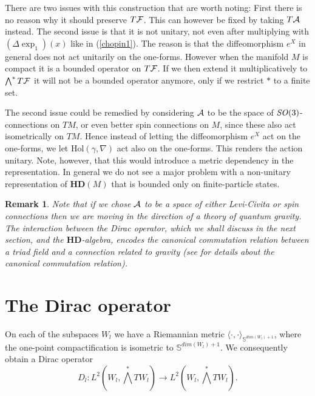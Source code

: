 \documentclass[letterpaper,12pt]{article}
\def\ca{{\cal A}}
\def\cf{{\cal F}}
\newtheorem{remark}{Remark}
\begin{document}
 There are two issues with this construction that are worth noting: First there is no reason why it should preserve $T\cf$. This can however be fixed by taking $T\ca$ instead.
  The second issue is that it is not unitary, not even after multiplying with $(\Delta \exp_1) (x)$ like in (\ref{chopin1}). The reason is that the diffeomorphism $e^X$ in general does not act unitarily on the one-forms. However when the manifold $M$ is compact it is a bounded operator on $T\cf$. If we then extend it multiplicatively to  $\bigwedge^* T\cf $ it will not be a bounded operator anymore, only if we restrict $*$ to a finite set.
  
  The second issue could be remedied by considering $\ca$ to be the space of $\SO3$-connections on $TM$, or even better spin connections on $M$, since these also act isometrically on $TM$. Hence instead of letting the diffeomorphism $e^X$ act on the one-forms, we let $\mbox{Hol}(\gamma,\nabla)$ act also on the one-forms. This renders the action unitary. Note, however, that this would introduce a metric dependency in the representation. 
 In general we do not see a major problem with a non-unitary representation of $\mathbf{HD}(M)$ that is bounded only on finite-particle states.
  
  
  
  \begin{remark}
  Note that if we chose $\ca$ to be a space of either Levi-Civita or spin connections then we are moving in the direction of a theory of quantum gravity. The interaction between the Dirac operator, which we shall discuss in the next section, and the $\mathbf{HD}$-algebra, encodes the canonical commutation relation between a triad field and a connection related to gravity \cite{Ashtekar:1986yd,Ashtekar:1987gu} (see \cite{Aastrup:2015gba} for details about the canonical commutation relation).
  \end{remark}









\section{The Dirac operator}
\label{Diracoperator}

On each of the subspaces $W_l$ we have a Riemannian metric $\langle \cdot ,\cdot \rangle_{\mathbb{S}^{dim (W_l) +1}}$, where the one-point compactification is isometric to $\mathbb{S}^{dim (W_l) +1}$. We consequently obtain a Dirac operator 
$$D_l:L^2(W_l,\bigwedge^*TW_l) \to L^2(W_l,\bigwedge^*TW_l)  .$$
 
\end{document}
